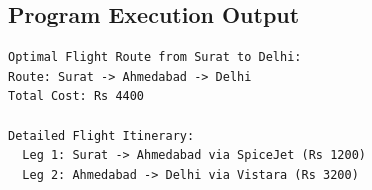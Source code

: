 \documentclass[12pt]{article}
\begin{document}
\subsection*{Program Execution Output}
\begin{lstlisting}[style=output]
Optimal Flight Route from Surat to Delhi:
Route: Surat -> Ahmedabad -> Delhi
Total Cost: Rs 4400

Detailed Flight Itinerary:
  Leg 1: Surat -> Ahmedabad via SpiceJet (Rs 1200)
  Leg 2: Ahmedabad -> Delhi via Vistara (Rs 3200)
\end{lstlisting}
\end{document}
